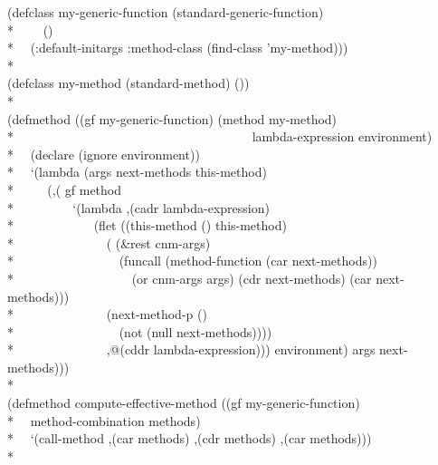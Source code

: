 \begin{defun}
\begin{defun}
\begin{lisp}
(defclass my-generic-function (standard-generic-function)\\*
~~~~()\\*
~~(:default-initargs :method-class (find-class 'my-method)))\\*
\\
(defclass my-method (standard-method) ())\\*
\\
(defmethod  ((gf my-generic-function) (method my-method)\\*
~~~~~~~~~~~~~~~~~~~~~~~~~~~~~~~~~~~~~lambda-expression environment)\\*
~~(declare (ignore environment))\\*
~~`(lambda (args next-methods this-method)\\*
~~~~ (,( gf method \\*
~~~~~~~~ `(lambda ,(cadr lambda-expression)\\*
~~~~~~~~~~~~(flet ((this-method () this-method) \\*
~~~~~~~~~~~~~~( (\&rest cnm-args)\\*
~~~~~~~~~~~~~~~~(funcall (method-function (car next-methods))\\*
~~~~~~~~~~~~~~~~~~(or cnm-args args) (cdr next-methods) (car next-methods)))\\*
~~~~~~~~~~~~~~(next-method-p ()\\*
~~~~~~~~~~~~~~~~(not (null next-methods))))\\*
~~~~~~~~~~~~~~,@(cddr lambda-expression))) environment) args next-methods)))\\*
\\
(defmethod compute-effective-method ((gf my-generic-function)\\*
~~method-combination methods)\\*
~~`(call-method ,(car methods) ,(cdr methods) ,(car methods)))\\*
\end{lisp}
\end{defun}
\end{defun}

